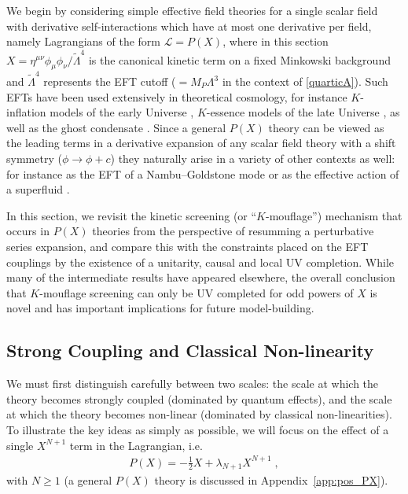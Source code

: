 \documentclass[11pt]{article}
\newcommand{\LambdaP}{\tilde{\Lambda}}
\begin{document}
We begin by considering simple effective field theories for a single scalar field with derivative self-interactions which have at most one derivative per field, namely Lagrangians of the form $\mathcal{L} = P(X)$, where in this section $X = \eta^{\mu\nu} \phi_\mu \phi_\nu / \LambdaP^4$ is the canonical kinetic term on a fixed Minkowski background and $\LambdaP^4$ represents the EFT cutoff ($=M_P \Lambda^3$ in the context of \eqref{quarticA}). 
Such EFTs have been used extensively in theoretical cosmology, for instance $K$-inflation models of the early Universe \cite{ArmendarizPicon:1999rj, Garriga:1999vw}, $K$-essence models of the late Universe \cite{Chiba:1999ka, ArmendarizPicon:2000dh, ArmendarizPicon:2000ah}, as well as the ghost condensate \cite{ArkaniHamed:2003uy}.
Since a general $P(X)$ theory can be viewed as the leading terms in a derivative expansion of any scalar field theory with a shift symmetry ($\phi \to \phi + c$) they naturally arise in a variety of other contexts as well: for instance as the EFT of a Nambu–Goldstone mode or as the effective action of a superfluid \cite{Greiter:1989qb, Son:2002zn}. 
 
In this section, we revisit the kinetic screening (or ``$K$-mouflage'') mechanism that occurs in $P(X)$ theories from the perspective of resumming a perturbative series expansion, 
and compare this with the constraints placed on the EFT couplings by the existence of a unitarity, causal and local UV completion. 
While many of the intermediate results have appeared elsewhere, the overall conclusion that $K$-mouflage screening can only be UV completed for odd powers of $X$ is novel and has important implications for future model-building.



\subsection{Strong Coupling and Classical Non-linearity}
\label{sec:PX_cutoff}

We must first distinguish carefully between two scales: the scale at which the theory becomes strongly coupled (dominated by quantum effects), and the scale at which the theory becomes non-linear (dominated by classical non-linearities). 
To illustrate the key ideas as simply as possible, we will focus on the effect of a single $X^{N+1}$ term in the Lagrangian, i.e. 
\begin{align}
P(X) = -\tfrac{1}{2} X + \lambda_{N+1} X^{N+1} \; , 
\label{eqn:PN}
\end{align}
with $N \geq 1$ (a general $P(X)$ theory is discussed in Appendix~\ref{app:pos_PX}).
\end{document}

